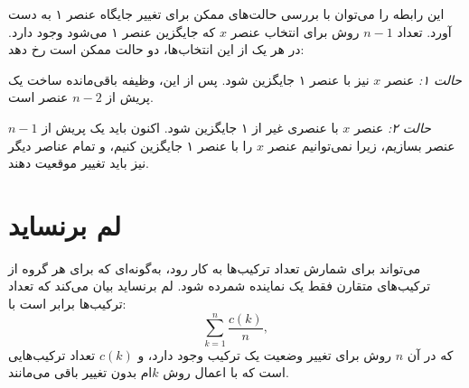 این رابطه را می‌توان با بررسی حالت‌های ممکن برای تغییر جایگاه عنصر ۱ به دست آورد.
تعداد $n-1$ روش برای انتخاب عنصر $x$ که جایگزین عنصر ۱ می‌شود وجود دارد.
در هر یک از این انتخاب‌ها، دو حالت ممکن است رخ دهد:

\textit{حالت ۱:} عنصر $x$ نیز با عنصر ۱ جایگزین شود.
پس از این، وظیفه باقی‌مانده ساخت یک پریش از $n-2$ عنصر است.

\textit{حالت ۲:} عنصر $x$ با عنصری غیر از ۱ جایگزین شود.
اکنون باید یک پریش از $n-1$ عنصر بسازیم، زیرا نمی‌توانیم عنصر $x$ را با عنصر ۱ جایگزین کنیم، و تمام عناصر دیگر نیز باید تغییر موقعیت دهند.

\section{لم برنساید}


می‌تواند برای شمارش تعداد ترکیب‌ها به کار رود، به‌گونه‌ای که برای هر گروه از ترکیب‌های متقارن فقط یک نماینده شمرده شود.
لم برنساید بیان می‌کند که تعداد ترکیب‌ها برابر است با:
\[\sum_{k=1}^n \frac{c(k)}{n},\]
که در آن $n$ روش برای تغییر وضعیت یک ترکیب وجود دارد، و $c(k)$ تعداد ترکیب‌هایی است که با اعمال روش $k$ام بدون تغییر باقی می‌مانند.

